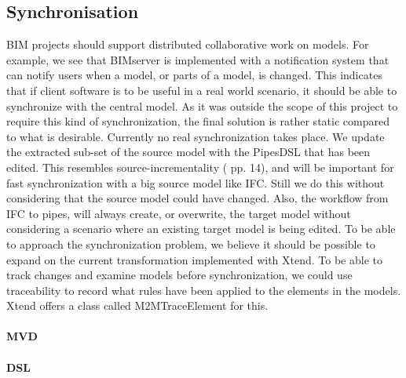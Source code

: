 \subsection{Synchronisation}
    BIM projects should support distributed collaborative work on models. For example, we see that BIMserver is implemented with a notification system that can notify users when a model, or parts of a model, is changed. This indicates that if client software is to be useful in a real world scenario, it should be able to synchronize with the central model. As it was outside the scope of this project to require this kind of synchronization, the final solution is rather static compared to what is desirable. Currently no real synchronization takes place. We update the extracted sub-set of the source model with the PipesDSL that has been edited. This resembles source-incrementality (\cite{czarnecki06} pp. 14), and will be important for fast synchronization with a big source model like IFC. Still we do this without considering that the source model could have changed. Also, the workflow from IFC to pipes, will always create, or overwrite, the target model without considering a scenario where an existing target model is being edited. To be able to approach the synchronization problem, we believe it should be possible to expand on the current transformation implemented with Xtend. To be able to track changes and examine models before synchronization, we could use traceability\cite{czarnecki06} to record what rules have been applied to the elements in the models. Xtend offers a class called M2MTraceElement\cite{xtendtrace} for this.



\paragraph{MVD}

\paragraph{DSL}


